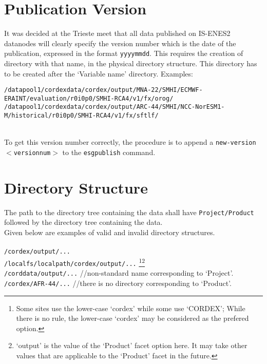 \section{Publication Version}
It was decided at the Trieste meet that all data published on IS-ENES2 datanodes will clearly specify the version number which is the date of the publication, expressed in the format \texttt{yyyymmdd}. This requires the creation of directory with that name, in the physical directory structure. This directory has to be created after the `Variable name' directory. Examples:\\
\begin{tiny}
\texttt{/datapool1/cordexdata/cordex/output/MNA-22/SMHI/ECMWF-ERAINT/evaluation/r0i0p0/SMHI-RCA4/v1/fx/orog/}\\
\texttt{/datapool1/cordexdata/cordex/output/ARC-44/SMHI/NCC-NorESM1-M/historical/r0i0p0/SMHI-RCA4/v1/fx/sftlf/}\\
\end{tiny}
\\To get this version number correctly, the procedure is to append a \texttt{\myopt new-version $<$versionnum$>$} to the \texttt{esgpublish} command.

\section{Directory Structure}
The path to the directory tree containing the data shall have \texttt{Project/Product} followed by the directory tree containing the data. \\
Given below are examples of valid and invalid directory structures.\\
\vspace{0mm}\\
\texttt{/cordex/output/...} \cmark\\
\texttt{/localfs/localpath/cordex/output/...} \footnote{Some sites use the lower-case `cordex' while some use `CORDEX'; While there is no rule, the lower-case `cordex' may be considered as the prefered option.}\footnote{`output' is the value of the `Product' facet option here. It may take other values that are applicable to the `Product' facet in the future.} \cmark\\
\texttt{/corddata/output/...} \xmark{ } //non-standard name corresponding to `Project'.  \\ 
\texttt{/cordex/AFR-44/...} \xmark{ } //there is no directory corresponding to `Product'.


